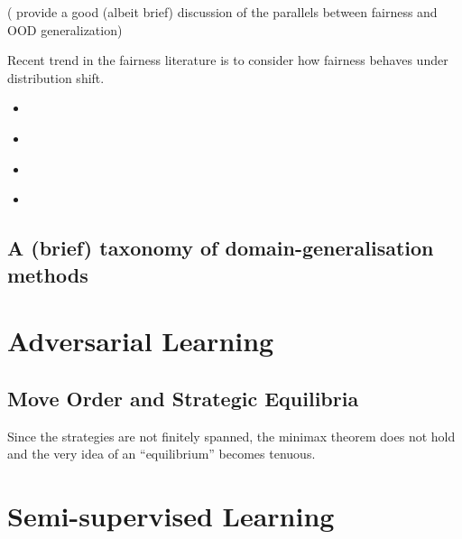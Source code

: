 (\citep{krueger2021out} provide a good (albeit brief) discussion of the parallels between fairness and OOD
generalization)

Recent trend in the fairness literature is to consider how fairness behaves under distribution
shift.
%
\begin{itemize}
  \item \cite{schrouff2022diagnosing}
  \item \cite{schrouff2022maintaining}
  \item \cite{singh2021fairness}
  \item \cite{slack2020fairness}

\end{itemize}


\subsection{A (brief) taxonomy of domain-generalisation methods}
%

\section{Adversarial Learning}\label{sec:adversarial_learning}
\cite{GooAbaMirXuetal14}
\subsection{Move Order and Strategic Equilibria} 
Since the strategies are not finitely spanned, the
minimax theorem does not hold and the very idea of an ``equilibrium'' becomes tenuous.


\section{ Semi-supervised Learning }\label{sec:SemiSL}
 
